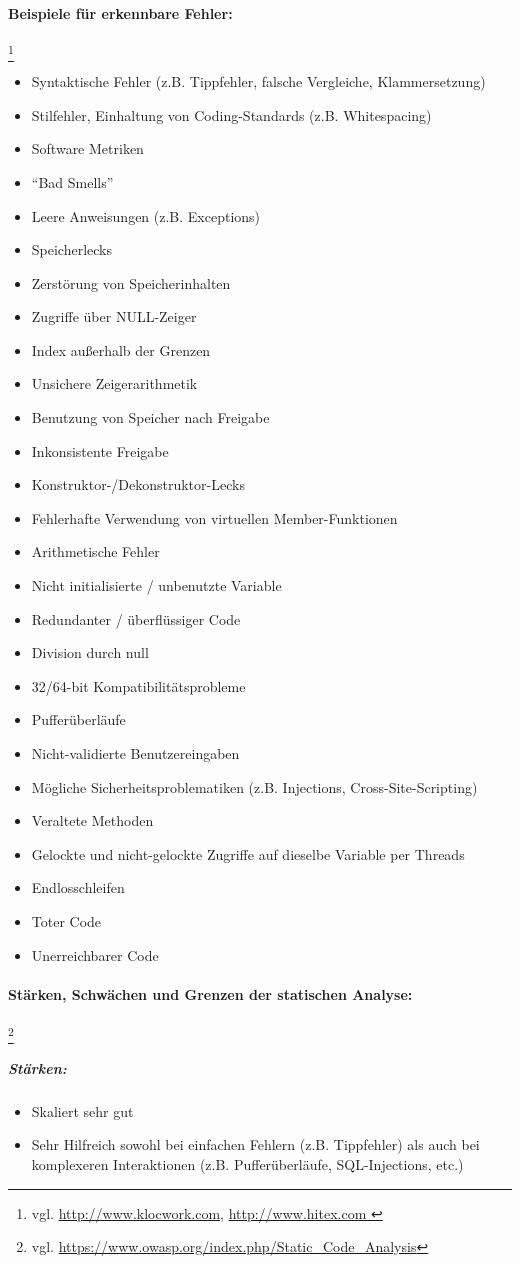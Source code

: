 \paragraph{Beispiele für erkennbare Fehler:}\footnote{vgl. \url{http://www.klocwork.com}, \url{http://www.hitex.com }}
\begin{itemize}
\item Syntaktische Fehler (z.B. Tippfehler, falsche Vergleiche, Klammersetzung)
\item Stilfehler, Einhaltung von Coding-Standards (z.B. Whitespacing)
\item Software Metriken
\item ``Bad Smells''
\item Leere Anweisungen (z.B. Exceptions)
\item Speicherlecks
\item Zerstörung von Speicherinhalten
\item Zugriffe über NULL-Zeiger
\item Index außerhalb der Grenzen
\item Unsichere Zeigerarithmetik
\item Benutzung von Speicher nach Freigabe
\item Inkonsistente Freigabe
\item Konstruktor-/Dekonstruktor-Lecks
\item Fehlerhafte Verwendung von virtuellen Member-Funktionen
\item Arithmetische Fehler
\item Nicht initialisierte / unbenutzte Variable
\item Redundanter / überflüssiger Code
\item Division durch null
\item 32/64-bit Kompatibilitätsprobleme
\item Pufferüberläufe
\item Nicht-validierte Benutzereingaben
\item Mögliche Sicherheitsproblematiken (z.B. Injections, Cross-Site-Scripting)
\item Veraltete Methoden
\item Gelockte und nicht-gelockte Zugriffe auf dieselbe Variable per Threads
\item Endlosschleifen
\item Toter Code
\item Unerreichbarer Code
\end{itemize}

\paragraph{Stärken, Schwächen und Grenzen der statischen Analyse:}\footnote{vgl. \url{https://www.owasp.org/index.php/Static_Code_Analysis}} 
\subparagraph{Stärken:}
\begin{itemize}
\item Skaliert sehr gut
\item Sehr Hilfreich sowohl bei einfachen Fehlern (z.B. Tippfehler) als auch bei komplexeren Interaktionen (z.B. Pufferüberläufe, SQL-Injections, etc.)
\end{itemize}

